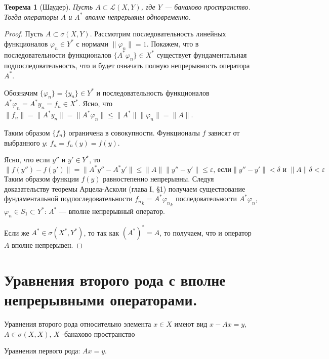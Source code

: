 \documentclass[12pt,a4paper,titlepage,oneside]{book}
\theoremstyle{definition}
\theoremstyle{plain}
\newtheorem*{theorem}{Теорема}
\theoremstyle{remark}
\theoremstyle{remark}
\theoremstyle{remark}
\theoremstyle{remark}
\theoremstyle{plain}
\theoremstyle{plain}
\begin{document}
\begin{theorem}[Шаудер]
Пусть $A\subset\mathcal{\mathcal{L}}(X, Y)$, где $Y$ --- банахово пространство. Тогда операторы $A$ и $A^*$ вполне непрерывны одновременно.
\end{theorem}

\begin{proof}
Пусть $A\subset\sigma(X, Y)$. Рассмотрим последовательность линейных функционалов $\varphi_n\in Y^*$ с нормами $\lVert \varphi_n\rVert = 1$. Покажем, что в последовательности функционалов $\{A^*\varphi_n\}\in X^*$ существует фундаментальная подпоследовательность, что и будет означать полную непрерывность оператора $A^*$.

Обозначим $\{\varphi_n\} = \{y_n\}\in Y^*$ и последовательность функционалов $A^*\varphi_n = A^*y_n = f_n\in X^*$. Ясно, что $\lVert f_n\rVert = \lVert A^*y_n\rVert = \lVert A^*\varphi_n\rVert \leqslant \lVert A^*\rVert\lVert \varphi_n\rVert = \lVert A\rVert$.

Таким образом $\{f_n\}$ ограничена в совокупности. Функционалы $f$ зависят от выбранного $y$: $f_n = f_n(y) = f(y)$.

Ясно, что если $y''$ и $y'\in Y^*$, то
\begin{equation*}
\lVert f(y'')-f(y')\rVert = \lVert A^*y''-A^*y'\rVert\le\lVert A\rVert\lVert y''-y'\rVert\le\varepsilon\mbox{, если} \lVert y''-y'\rVert < \delta\mbox{ и }\lVert A\rVert\delta < \varepsilon
\end{equation*}
Таким образом функции $f(y)$ равностепенно непрерывны. Следуя доказательству теоремы Арцела-Асколи (глава I, \S 1) получаем существование фундаментальной подпоследовательности ${f_n}_k = A^*{\varphi_n}_k$ последовательности $A^*\varphi_n$, $\varphi_n\in S_1\subset Y^*$: $A^*$ --- вполне непрерывный оператор.

Если же $A^*\in\sigma(X^*,Y^*)$, то так как $(A^*)^* = A$, то получаем, что и оператор $A$ вполне непрерывен.
\end{proof}

\section{Уравнения второго рода с вполне непрерывными операторами.}
Уравнения второго рода относительно элемента $x \in X$ имеют вид $x-Ax=y$, $A \in \sigma(X,X)$, $X$ -банахово пространство

Уравнения первого рода: $Ax=y$.
\end{document}
